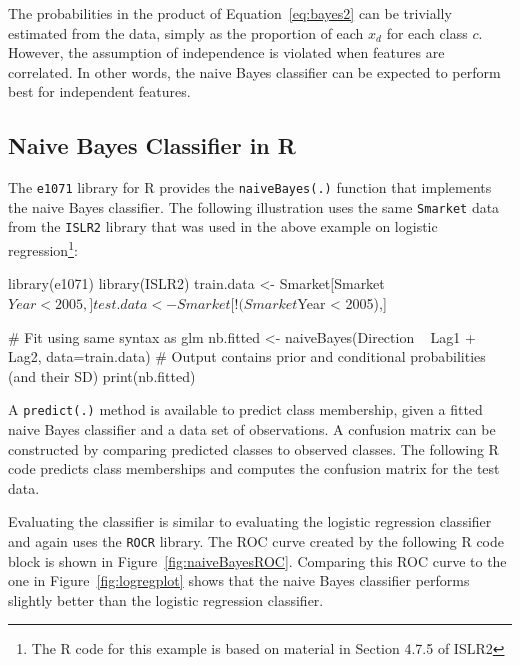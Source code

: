 The probabilities in the product of Equation~\ref{eq:bayes2} can be trivially estimated from the data, simply as the proportion of each $x_d$ for each class $c$. However, the assumption of independence is violated when features are correlated. In other words, the naive Bayes classifier can be expected to perform best for independent features.

\subsection{Naive Bayes Classifier in R}

The \texttt{e1071} library for R provides the \texttt{naiveBayes(.)} function that implements the naive Bayes classifier. The following illustration uses the same \texttt{Smarket} data from the \texttt{ISLR2} library that was used in the above example on logistic regression\footnote{The R code for this example is based on material in Section 4.7.5 of ISLR2}:

\begin{samepage}
\begin{Rcode}
library(e1071)
library(ISLR2)
train.data <- Smarket[Smarket$Year < 2005,]
test.data <- Smarket[!(Smarket$Year < 2005),]

# Fit using same syntax as glm
nb.fitted <- naiveBayes(Direction ~ Lag1 + Lag2, data=train.data)
# Output contains prior and conditional probabilities (and their SD)
print(nb.fitted)
\end{Rcode}
\end{samepage}

\noindent A \texttt{predict(.)} method is available to predict class membership, given a fitted naive Bayes classifier and a data set of observations. A confusion matrix can be constructed by comparing predicted classes to observed classes. The following R code predicts class memberships and computes the confusion matrix for the test data.

\begin{samepage}
\end{samepage}

Evaluating the classifier is similar to evaluating the logistic regression classifier and again uses the \texttt{ROCR} library. The ROC curve created by the following R code block is shown in Figure~\ref{fig:naiveBayesROC}. Comparing this ROC curve to the one in Figure~\ref{fig:logregplot} shows that the naive Bayes classifier performs slightly better than the logistic regression classifier. 

